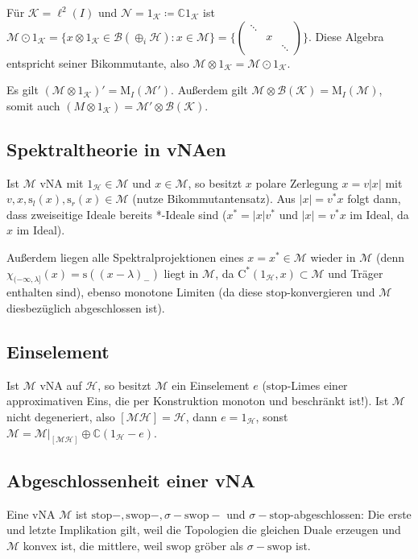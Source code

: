 \documentclass[11pt,a4paper]{scrartcl}
\newcommand{\C}{\mathbb{C}} %
\newcommand{\Hc}{\mathcal{H}}
\newcommand{\Kc}{\mathcal{K}}
\newcommand{\B}{\mathcal{B}}
\newcommand{\M}{\mathcal{M}}
\newcommand{\Nc}{\mathcal{N}}
\theoremstyle{plain}
\theoremstyle{definition}
\theoremstyle{remark}
\begin{document}
Für $\Kc = \ell^2(I)$ und $\Nc=1_\Kc\coloneqq \C 1_\Kc$ ist $\M\odot 1_\Kc = \{ x\otimes 1_\Kc \in \B(\oplus_i \Hc): x\in \M \}=\{ \left( \begin{smallmatrix} \ddots & & \\ & x & \\ & & \ddots \end{smallmatrix} \right) \}$. Diese Algebra entspricht seiner Bikommutante, also $\M\otimes 1_\Kc = \M \odot 1_\Kc$.

Es gilt $(\M\otimes 1_\Kc)'=\mathrm{M}_I(\M')$. Außerdem gilt $\M\otimes \B(\Kc)=\mathrm{M}_I(\M)$, somit auch $(M\otimes 1_\Kc)=\M'\otimes \B(\Kc)$.

\subsection{Spektraltheorie in vNAen}

Ist $\M$ vNA mit $1_\Hc \in \M$ und $x\in \M$, so besitzt $x$ polare Zerlegung $x=v|x|$ mit $v,x,\mathrm{s}_l(x),\mathrm{s}_r(x)\in \M$ (nutze Bikommutantensatz). Aus $|x|=v^*x$ folgt dann, dass zweiseitige Ideale bereits *-Ideale sind ($x^*=|x|v^*$ und $|x|=v^*x$ im Ideal, da $x$ im Ideal).

Außerdem liegen alle Spektralprojektionen eines $x=x^*\in \M$ wieder in $\M$ (denn $\chi_{(-\infty, \lambda]}(x)=\mathrm{s}((x-\lambda)_{-})$ liegt in $\M$, da $\mathrm{C}^*(1_\Hc, x) \subset \M$ und Träger enthalten sind), ebenso monotone Limiten (da diese $\mathrm{stop}$-konvergieren und $\M$ diesbezüglich abgeschlossen ist).

\subsection{Einselement}

Ist $\M$ vNA auf $\Hc$, so besitzt $\M$ ein Einselement $e$ ($\mathrm{stop}$-Limes einer approximativen Eins, die per Konstruktion monoton und beschränkt ist!). Ist $\M$ nicht degeneriert, also $[\M\Hc]=\Hc$, dann $e=1_\Hc$, sonst $\M=\M|_{[\M\Hc]}\oplus \C (1_\Hc-e)$.

\subsection{Abgeschlossenheit einer vNA}

Eine vNA $\M$ ist $\mathrm{stop}-,\mathrm{swop}-,\sigma-\mathrm{swop}-$ und $\sigma-\mathrm{stop}$-abgeschlossen: Die erste und letzte Implikation gilt, weil die Topologien die gleichen Duale erzeugen und $\M$ konvex ist, die mittlere, weil $\mathrm{swop}$ gröber als $\sigma-\mathrm{swop}$ ist.
\end{document}
